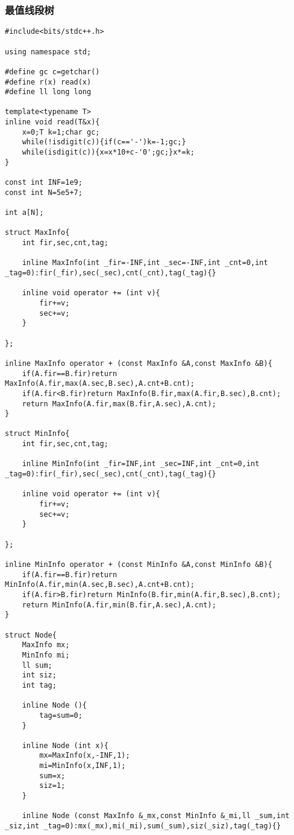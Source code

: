 \documentclass{ctexart}
\begin{document}
\subsubsection{最值线段树}
\begin{lstlisting}
#include<bits/stdc++.h>

using namespace std;

#define gc c=getchar()
#define r(x) read(x)
#define ll long long

template<typename T>
inline void read(T&x){
    x=0;T k=1;char gc;
    while(!isdigit(c)){if(c=='-')k=-1;gc;}
    while(isdigit(c)){x=x*10+c-'0';gc;}x*=k;
}

const int INF=1e9;
const int N=5e5+7;

int a[N];

struct MaxInfo{
	int fir,sec,cnt,tag;
	
	inline MaxInfo(int _fir=-INF,int _sec=-INF,int _cnt=0,int _tag=0):fir(_fir),sec(_sec),cnt(_cnt),tag(_tag){}
	
	inline void operator += (int v){
		fir+=v;
		sec+=v;
	}

};

inline MaxInfo operator + (const MaxInfo &A,const MaxInfo &B){
	if(A.fir==B.fir)return MaxInfo(A.fir,max(A.sec,B.sec),A.cnt+B.cnt);
	if(A.fir<B.fir)return MaxInfo(B.fir,max(A.fir,B.sec),B.cnt);
	return MaxInfo(A.fir,max(B.fir,A.sec),A.cnt);
}

struct MinInfo{
	int fir,sec,cnt,tag;
	
	inline MinInfo(int _fir=INF,int _sec=INF,int _cnt=0,int _tag=0):fir(_fir),sec(_sec),cnt(_cnt),tag(_tag){}
	
	inline void operator += (int v){
		fir+=v;
		sec+=v;
	}

};

inline MinInfo operator + (const MinInfo &A,const MinInfo &B){
	if(A.fir==B.fir)return MinInfo(A.fir,min(A.sec,B.sec),A.cnt+B.cnt);
	if(A.fir>B.fir)return MinInfo(B.fir,min(A.fir,B.sec),B.cnt);
	return MinInfo(A.fir,min(B.fir,A.sec),A.cnt);
}

struct Node{
	MaxInfo mx;
	MinInfo mi;
	ll sum;
	int siz;
	int tag;
	
	inline Node (){
		tag=sum=0;
	}
	
	inline Node (int x){
		mx=MaxInfo(x,-INF,1);
		mi=MinInfo(x,INF,1);
		sum=x;
		siz=1;
	}
	
	inline Node (const MaxInfo &_mx,const MinInfo &_mi,ll _sum,int _siz,int _tag=0):mx(_mx),mi(_mi),sum(_sum),siz(_siz),tag(_tag){}
	

\end{lstlisting}
\end{document}
